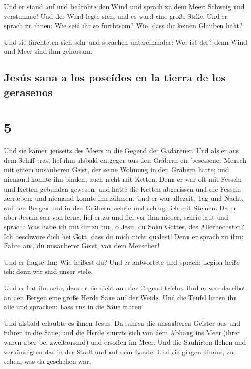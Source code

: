  Und er stand auf und bedrohte den Wind und sprach zu dem
Meer: Schweig und verstumme! Und der Wind legte sich, und es ward eine
große Stille.  Und er sprach zu ihnen: Wie seid ihr so
furchtsam? Wie, dass ihr keinen Glauben habt?

 Und sie fürchteten sich sehr und sprachen untereinander:
Wer ist der? denn Wind und Meer sind ihm gehorsam.

\hypertarget{jesuxfas-sana-a-los-poseuxeddos-en-la-tierra-de-los-gerasenos}{%
\subsection{Jesús sana a los poseídos en la tierra de los
gerasenos}\label{jesuxfas-sana-a-los-poseuxeddos-en-la-tierra-de-los-gerasenos}}

\hypertarget{section-4}{%
\section{5}\label{section-4}}

 Und sie kamen jenseits des Meers in die Gegend der
Gadarener.  Und als er aus dem Schiff trat, lief ihm
alsbald entgegen aus den Gräbern ein besessener Mensch mit einem
unsauberen Geist,  der seine Wohnung in den Gräbern hatte;
und niemand konnte ihn binden, auch nicht mit Ketten. 
Denn er war oft mit Fesseln und Ketten gebunden gewesen, und hatte die
Ketten abgerissen und die Fesseln zerrieben; und niemand konnte ihn
zähmen.  Und er war allezeit, Tag und Nacht, auf den
Bergen und in den Gräbern, schrie und schlug sich mit Steinen.
 Da er aber Jesum sah von ferne, lief er zu und fiel vor
ihm nieder, schrie laut und sprach:  Was habe ich mit dir
zu tun, o Jesu, du Sohn Gottes, des Allerhöchsten? Ich beschwöre dich
bei Gott, dass du mich nicht quälest!  Denn er sprach zu
ihm: Fahre aus, du unsauberer Geist, von dem Menschen!

 Und er fragte ihn: Wie heißest du? Und er antwortete und
sprach: Legion heiße ich; denn wir sind unser viele.

 Und er bat ihn sehr, dass er sie nicht aus der Gegend
triebe.  Und es war daselbst an den Bergen eine große
Herde Säue auf der Weide.  Und die Teufel baten ihn alle
und sprachen: Lass uns in die Säue fahren!

 Und alsbald erlaubte es ihnen Jesus. Da fuhren die
unsauberen Geister aus und fuhren in die Säue; und die Herde stürzte
sich von dem Abhang ins Meer (ihrer waren aber bei zweitausend) und
ersoffen im Meer.  Und die Sauhirten flohen und
verkündigten das in der Stadt und auf dem Lande. Und sie gingen hinaus,
zu sehen, was da geschehen war,

